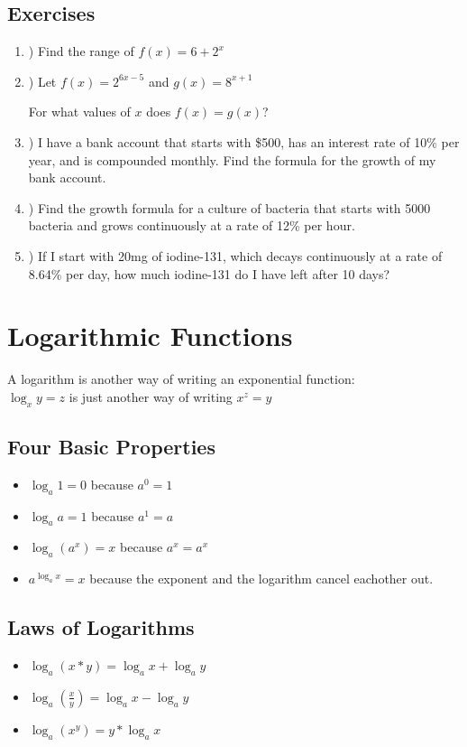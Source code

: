 \documentclass[fleqn]{article}
\newcommand\tab[1][1cm]{\hspace*{#1}}
\begin{document}
\subsection{Exercises}
\renewcommand{\labelenumi}{\alph{enumi}}
\begin{enumerate}
    \item) Find the range of \(f(x) = 6 + 2^x\) 
    \item) Let \(f(x) = 2^{6x-5}\) \tab[.05cm] and \tab[.03cm] \(g(x) = 8^{x+1}\)
    
    \tab[0.2cm]For what values of \(x\) does \(f(x) = g(x)\)?
    \item) I have a bank account that starts with \$500, has an interest rate of 10\% per year, and is compounded monthly. Find the formula for the growth of my bank account.
    \item) Find the growth formula for a culture of bacteria that starts with 5000 bacteria and grows continuously at a rate of 12\% per hour.
    \item) If I start with 20mg of iodine-131, which decays continuously at a rate of 8.64\% per day, how much iodine-131 do I have left after 10 days?
\end{enumerate}

\clearpage

\section{Logarithmic Functions}
A logarithm is another way of writing an exponential function:\\
\tab \(\log_x y = z \) is just another way of writing \(x^z = y\)
\subsection{Four Basic Properties}
\begin{itemize}
    \item \(\log_a 1 = 0\) because \(a^0 = 1\)
    \item \(\log_a a = 1\) because \(a^1 = a\)
    \item \(\log_a (a^x) = x\) because \(a^x = a^x\)
    \item \(a^{\log_a x} = x\) because the exponent and the logarithm cancel eachother out.
\end{itemize}

\subsection{Laws of Logarithms}
\begin{itemize}
    \item \(\log_a (x*y) = \log_a x + \log_a y\)
    \item \(\log_a (\frac{x}{y}) = \log_a x - \log_a y\)
    \item \(\log_a (x^y) = y*\log_a x\)
\end{itemize}
\end{document}

